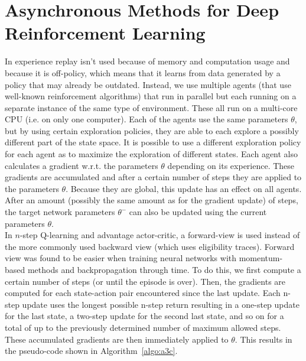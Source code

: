 \section{Asynchronous Methods for Deep Reinforcement Learning}
\label{sec:a3c}
In \cite{Mnih2016AsynchronousLearning} experience replay isn't used because of memory and computation usage and because it is off-policy, which means that it learns from data generated by a policy that may already be outdated.
Instead, we use multiple agents (that use well-known reinforcement algorithms) that run in parallel but each running on a separate instance of the same type of environment.
These all run on a multi-core CPU (i.e.
on only one computer).
Each of the agents use the same parameters $\theta$, but by using certain exploration policies, they are able to each explore a possibly different part of the state space.
It is possible to use a different exploration policy for each agent as to maximize the exploration of different states.
Each agent also calculates a gradient w.r.t.
the parameters $\theta$ depending on its experience.
These gradients are accumulated and after a certain number of steps they are applied to the parameters $\theta$.
Because they are global, this update has an effect on all agents.
After an amount (possibly the same amount as for the gradient update) of steps, the target network parameters $\theta^{-}$ can also be updated using the current parameters $\theta$.\\
In $n$-step Q-learning and advantage actor-critic, a forward-view is used instead of the more commonly used backward view (which uses eligibility traces).
Forward view was found to be easier when training neural networks with momentum-based methods and backpropagation through time.
To do this, we first compute a certain number of steps (or until the episode is over).
Then, the gradients are computed for each state-action pair encountered since the last update.
Each n-step update uses the longest possible n-step return resulting in a one-step update for the last state, a two-step update for the second last state, and so on for a total of up to the previously determined number of maximum allowed steps.
These accumulated gradients are then immediately applied to $\theta$.
This results in the pseudo-code shown in Algorithm~\ref{algo:a3c}.\\
